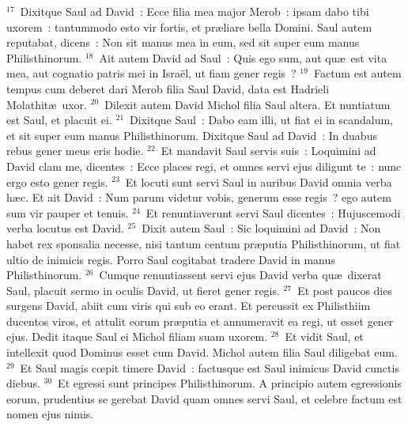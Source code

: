 ${}^{17}$~Dixitque Saul ad David~: Ecce filia mea major Merob~: ipsam dabo tibi uxorem~: tantummodo esto vir fortis, et pr\ae liare bella Domini. Saul autem reputabat, dicens~: Non sit manus mea in eum, sed sit super eum manus Philisthinorum.
${}^{18}$~Ait autem David ad Saul~: Quis ego sum, aut qu\ae\ est vita mea, aut cognatio patris mei in Isra\"el, ut fiam gener regis~?
${}^{19}$~Factum est autem tempus cum deberet dari Merob filia Saul David, data est Hadrieli Molathit\ae\ uxor.
${}^{20}$~Dilexit autem David Michol filia Saul altera. Et nuntiatum est Saul, et placuit ei.
${}^{21}$~Dixitque Saul~: Dabo eam illi, ut fiat ei in scandalum, et sit super eum manus Philisthinorum. Dixitque Saul ad David~: In duabus rebus gener meus eris hodie.
${}^{22}$~Et mandavit Saul servis suis~: Loquimini ad David clam me, dicentes~: Ecce places regi, et omnes servi ejus diligunt te~: nunc ergo esto gener regis.
${}^{23}$~Et locuti sunt servi Saul in auribus David omnia verba h\ae c. Et ait David~: Num parum videtur vobis, generum esse regis~? ego autem sum vir pauper et tenuis.
${}^{24}$~Et renuntiaverunt servi Saul dicentes~: Hujuscemodi verba locutus est David.
${}^{25}$~Dixit autem Saul~: Sic loquimini ad David~: Non habet rex sponsalia necesse, nisi tantum centum pr\ae putia Philisthinorum, ut fiat ultio de inimicis regis. Porro Saul cogitabat tradere David in manus Philisthinorum.
${}^{26}$~Cumque renuntiassent servi ejus David verba qu\ae\ dixerat Saul, placuit sermo in oculis David, ut fieret gener regis.
${}^{27}$~Et post paucos dies surgens David, abiit cum viris qui sub eo erant. Et percussit ex Philisthiim ducentos viros, et attulit eorum pr\ae putia et annumeravit ea regi, ut esset gener ejus. Dedit itaque Saul ei Michol filiam suam uxorem.
${}^{28}$~Et vidit Saul, et intellexit quod Dominus esset cum David. Michol autem filia Saul diligebat eum.
${}^{29}$~Et Saul magis cœpit timere David~: factusque est Saul inimicus David cunctis diebus.
${}^{30}$~Et egressi sunt principes Philisthinorum. A principio autem egressionis eorum, prudentius se gerebat David quam omnes servi Saul, et celebre factum est nomen ejus nimis.

